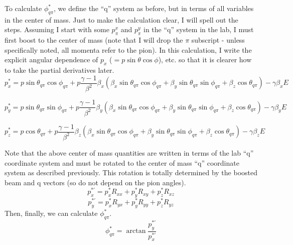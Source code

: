 To calculate $\phi^*_{q\pi}$, we define the ``q'' system as before, but in 
terms of all variables in the center of mass.  Just to make the calculation 
clear, I will spell out the steps.  Assuming I start with some $p_{\pi}^x$ and
$p_{\pi}^y$ in the ``q'' system in the lab, I must first boost to the center of
mass (note that I will drop the $\pi$ subscript - unless specifically noted, 
all momenta refer to the pion).  In this calculation, I write the explicit 
angular dependence of $p_x$ ($=p\sin{\theta}\cos{\phi}$), etc. so that it is 
clearer how to take the partial derivatives later.
$$
p_x^* = p\sin{\theta_{q\pi}}\cos{\phi_{q\pi}} + 
p\frac{\gamma-1}{\beta^2}\beta_x(\beta_x\sin{\theta_{q\pi}}\cos{\phi_{q\pi}}+
\beta_y\sin{\theta_{q\pi}}\sin{\phi_{q\pi}}+\beta_z\cos{\theta_{q\pi}}) - 
\gamma\beta_xE
$$

$$
p_y^* = p\sin{\theta_{q\pi}}\sin{\phi_{q\pi}} + 
p\frac{\gamma-1}{\beta^2}\beta_y(\beta_x\sin{\theta_{q\pi}}\cos{\phi_{q\pi}}+
\beta_y\sin{\theta_{q\pi}}\sin{\phi_{q\pi}}+\beta_z\cos{\theta_{q\pi}}) - 
\gamma\beta_yE
$$

$$
p_z^* = p\cos{\theta_{q\pi}} + 
p\frac{\gamma-1}{\beta^2}\beta_z(\beta_x\sin{\theta_{q\pi}}\cos{\phi_{q\pi}}+
\beta_y\sin{\theta_{q\pi}}\sin{\phi_{q\pi}}+\beta_z\cos{\theta_{q\pi}}) - 
\gamma\beta_zE
$$

Note that the above center of mass quantities are written in terms of the lab
``q'' coordinate system and must be rotated to the center of mass ``q'' 
coordinate system as described previously. This rotation is totally determined
by the boosted beam and q vectors (so do not depend on the pion angles).
$$
p_x^{*'} = p_x^* R_{xx} + p_y^* R_{xy} + p_z^* R_{xz}
$$
$$
p_y^{*'} = p_x^* R_{yx} + p_y^* R_{yy} + p_z^* R_{yz}
$$
Then, finally, we can calculate $\phi_{q\pi}^*$.
$$
\phi_{q\pi}^* = \arctan{\frac{p_y^{*'}}{p_x^{*'}}}
$$

